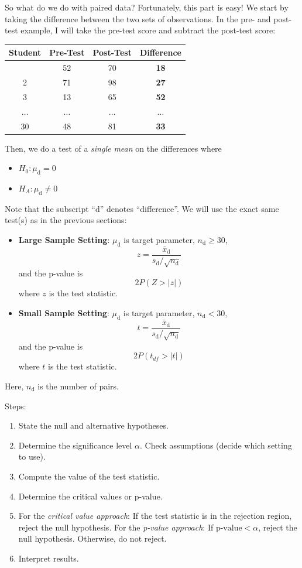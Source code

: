 \documentclass[
]{book}
\providecommand{\tightlist}{%
  \setlength{\itemsep}{0pt}\setlength{\parskip}{0pt}}
\begin{document}
So what do we do with paired data? Fortunately, this part is easy! We start by taking the difference between the two sets of observations. In the pre- and post-test example, I will take the pre-test score and subtract the post-test score:

\begin{longtable}[]{@{}cccc@{}}
\toprule\noalign{}
Student & Pre-Test & Post-Test & \textbf{Difference} \\
\midrule\noalign{}
\endhead
\bottomrule\noalign{}
\endlastfoot
1 & 52 & 70 & \textbf{18} \\
2 & 71 & 98 & \textbf{27} \\
3 & 13 & 65 & \textbf{52} \\
\(\dots\) & \(\dots\) & \(\dots\) & \(\dots\) \\
30 & 48 & 81 & \textbf{33} \\
\end{longtable}

Then, we do a test of a \emph{single mean} on the differences where

\begin{itemize}
\tightlist
\item
  \(H_0: \mu_{\text{d}} = 0\)
\item
  \(H_A: \mu_{\text{d}} \ne 0\)
\end{itemize}

Note that the subscript ``d'' denotes ``difference''. We will use the exact same test(s) as in the previous sections:

\begin{itemize}
\item
  \textbf{Large Sample Setting}: \(\mu_{\text{d}}\) is target parameter, \(n_{\text{d}} \ge 30\), \[z = \frac{\bar{x}_{\text{d}}}{s_{\text{d}}/\sqrt{n_{\text{d}}}}\] and the p-value is \[2P(Z > |z|)\] where \(z\) is the test statistic.
\item
  \textbf{Small Sample Setting}: \(\mu_{\text{d}}\) is target parameter, \(n_{\text{d}} < 30\), \[t = \frac{\bar{x}_{\text{d}}}{s_{\text{d}}/\sqrt{n_{\text{d}}}}\] and the p-value is \[2P(t_{df} > |t|)\] where \(t\) is the test statistic.
\end{itemize}

Here, \(n_{\text{d}}\) is the number of pairs.

Steps:

\begin{enumerate}
\def\labelenumi{\arabic{enumi}.}
\tightlist
\item
  State the null and alternative hypotheses.
\item
  Determine the significance level \(\alpha\). Check assumptions (decide which setting to use).
\item
  Compute the value of the test statistic.
\item
  Determine the critical values or p-value.
\item
  For the \emph{critical value approach}: If the test statistic is in the rejection region, reject the null hypothesis. For the \emph{p-value approach}: If \(\text{p-value} < \alpha\), reject the null hypothesis. Otherwise, do not reject.
\item
  Interpret results.
\end{enumerate}
\end{document}
